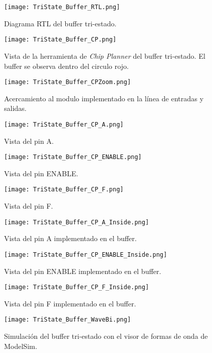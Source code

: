 \begin{figure}[ht]
	\centering
	\texttt{[image: TriState\_Buffer\_RTL.png]}
	\caption{Diagrama RTL del buffer tri-estado. \label{fig:tristate_buffer_rtl}}
\end{figure}

\begin{figure}[ht]
	\centering
	\texttt{[image: TriState\_Buffer\_CP.png]}
	\caption{Vista de la herramienta de \textit{Chip Planner} del buffer tri-estado. El buffer se observa dentro del circulo rojo. \label{fig:tristate_buffer_CP}}
\end{figure}

\begin{figure}[ht]
	\centering
	\texttt{[image: TriState\_Buffer\_CPZoom.png]}
	\caption {Acercamiento al modulo implementado en la línea de entradas y salidas. \label{fig:tristate_buffer_CPZoom}}
\end{figure}

\begin{figure}[ht]
	\centering
	\texttt{[image: TriState\_Buffer\_CP\_A.png]}
	\caption{Vista del pin A. \label{fig:tristate_buffer_CP_A}}
\end{figure}

\begin{figure}[ht]
	\centering
	\texttt{[image: TriState\_Buffer\_CP\_ENABLE.png]}
	\caption{Vista del pin ENABLE. \label{fig:tristate_buffer_CP_ENABLE}}
\end{figure}

\begin{figure}[ht]
	\centering
	\texttt{[image: TriState\_Buffer\_CP\_F.png]}
	\caption{Vista del pin F. \label{fig:tristate_buffer_CP_F}}
\end{figure}

\begin{figure}[ht]
	\centering
	\texttt{[image: TriState\_Buffer\_CP\_A\_Inside.png]}
	\caption{Vista del pin A implementado en el buffer. \label{fig:tristate_buffer_CP_A_Inside}}
\end{figure}

\begin{figure}[ht]
	\centering
	\texttt{[image: TriState\_Buffer\_CP\_ENABLE\_Inside.png]}
	\caption{Vista del pin ENABLE implementado en el buffer. \label{fig:tristate_buffer_CP_ENABLE_Inside}}
\end{figure}

\begin{figure}[ht]
	\centering
	\texttt{[image: TriState\_Buffer\_CP\_F\_Inside.png]}
	\caption{Vista del pin F implementado en el buffer. \label{fig:tristate_buffer_CP_F_Inside}}
\end{figure}

\begin{figure}[ht]
	\centering
	\texttt{[image: TriState\_Buffer\_WaveBi.png]}
	\caption{Simulación del buffer tri-estado con el visor de formas de onda de ModelSim. \label{fig:tristate_buffer_WaveBi}}
\end{figure}